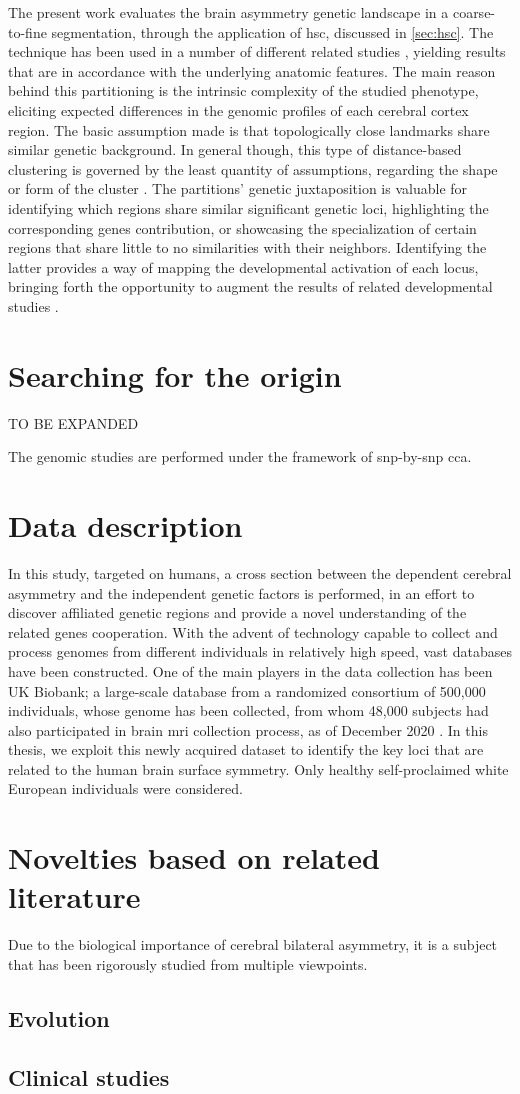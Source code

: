 The present work evaluates the brain asymmetry genetic landscape in a coarse-to-fine segmentation, through the application of \ac{hsc}\cite{Ng2002}, discussed in \autoref{sec:hsc}. The technique has been used in a number of different related studies \cite{Claes2018}\cite{Naqvi2021}, yielding results that are in accordance with the underlying anatomic features. The main reason behind this partitioning is the intrinsic complexity of the studied phenotype, eliciting expected differences in the genomic profiles of each cerebral cortex region. The basic assumption made is that topologically close landmarks share similar genetic background. In general though, this type of distance-based clustering is governed by the least quantity of assumptions, regarding the shape or form of the cluster \cite{VonLuxburg2007}. The partitions' genetic juxtaposition is valuable for identifying which regions share similar significant genetic loci, highlighting the corresponding genes contribution, or showcasing the specialization of certain regions that share little to no similarities with their neighbors. Identifying the latter provides a way of mapping the developmental activation of each locus, bringing forth the opportunity to augment the results of related developmental studies \cite{Vijayakumar2016}.

\section{Searching for the origin}
TO BE EXPANDED

The genomic studies are performed under the framework of \ac{snp}-by-\ac{snp} \ac{cca}. 


\section{Data description}
In this study, targeted on humans, a cross section between the dependent cerebral asymmetry and the independent genetic factors is performed, in an effort to discover affiliated genetic regions and provide a novel understanding of the related genes cooperation. With the advent of technology capable to collect and process genomes from different individuals in relatively high speed, vast databases have been constructed. One of the main players in the data collection has been UK Biobank; a large-scale database from a randomized consortium of 500,000 individuals, whose genome has been collected, from whom  48,000 subjects had also participated in brain \ac{mri} collection process, as of December 2020 \cite{Littlejohns2020}. In this thesis, we exploit this newly acquired dataset to identify the key loci that are related to the human brain surface symmetry. Only healthy self-proclaimed white European individuals were considered. 

\section{Novelties based on related literature} 
 Due to the biological importance of cerebral bilateral asymmetry, it is a subject that has been rigorously studied from multiple viewpoints.
 \subsection{Evolution}

 \subsection{Clinical studies}
 